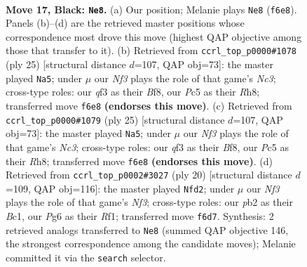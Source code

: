 \documentclass[11pt]{article}
\begin{document}
\clearpage

\begin{figure}[p]\centering
\begin{subfigure}{0.46\textwidth}\centering
\resizebox{\linewidth}{!}{%
\newchessgame
\chessboard[
  setfen={2bq1r2/r3bpkp/p2p1np1/n1pBp3/Pp2P3/3P1Q1N/1PPB1PPP/RN2R1K1 b - - 3 17},
  showmover=false,
  pgfstyle=straightmove, color=movearrow, markmove={f6-e8}
]}
\caption{}
\end{subfigure}\hfill
\begin{subfigure}{0.46\textwidth}\centering
\resizebox{\linewidth}{!}{%
\newchessgame
\chessboard[
  setfen={r3kbnr/1b1q1ppp/ppn1p3/3pP3/P1pP2Q1/N1P2N2/1PB2PPP/R1B2RK1 b kq - 1 13},
  showmover=false,
  pgfstyle=straightmove, color=movearrow, markmove={c6-a5}
]}
\caption{}
\end{subfigure}
\\[4pt]
\begin{subfigure}{0.46\textwidth}\centering
\resizebox{\linewidth}{!}{%
\newchessgame
\chessboard[
  setfen={r3kbnr/1b1q1ppp/ppn1p3/3pP3/P1pP2Q1/N1P2N2/1PB2PPP/R1B2RK1 b kq - 1 13},
  showmover=false,
  pgfstyle=straightmove, color=movearrow, markmove={c6-a5}
]}
\caption{}
\end{subfigure}\hfill
\begin{subfigure}{0.46\textwidth}\centering
\resizebox{\linewidth}{!}{%
\newchessgame
\chessboard[
  setfen={r3k2r/ppp1npp1/1bnpbq1p/4p3/P1N1P3/1BPP1N2/1P3PPP/R1BQ1RK1 w kq - 3 11},
  showmover=false,
  pgfstyle=straightmove, color=movearrow, markmove={f3-d2}
]}
\caption{}
\end{subfigure}
\caption{\textbf{Move 17, Black: \texttt{Ne8}.} (a) Our position; Melanie plays \texttt{Ne8} (\texttt{f6e8}). Panels (b)--(d) are the retrieved master positions whose correspondence most drove this move (highest QAP objective among those that transfer to it). (b) Retrieved from \texttt{ccrl\_top\_p0000\#1078} (ply 25) [structural distance $d$=107, QAP obj=73]: the master played \texttt{Na5}; under $\mu$ our \emph{Nf3} plays the role of that game's \emph{Nc3}; cross-type roles: our \emph{q}f3 as their \emph{B}f8, our \emph{P}c5 as their \emph{R}h8; transferred move \texttt{f6e8} \textbf{(endorses this move)}. (c) Retrieved from \texttt{ccrl\_top\_p0000\#1079} (ply 25) [structural distance $d$=107, QAP obj=73]: the master played \texttt{Na5}; under $\mu$ our \emph{Nf3} plays the role of that game's \emph{Nc3}; cross-type roles: our \emph{q}f3 as their \emph{B}f8, our \emph{P}c5 as their \emph{R}h8; transferred move \texttt{f6e8} \textbf{(endorses this move)}. (d) Retrieved from \texttt{ccrl\_top\_p0002\#3027} (ply 20) [structural distance $d$=109, QAP obj=116]: the master played \texttt{Nfd2}; under $\mu$ our \emph{Nf3} plays the role of that game's \emph{Nf3}; cross-type roles: our \emph{p}b2 as their \emph{B}c1, our \emph{P}g6 as their \emph{R}f1; transferred move \texttt{f6d7}. Synthesis: 2 retrieved analogs transferred to \texttt{Ne8} (summed QAP objective 146, the strongest correspondence among the candidate moves); Melanie committed it via the \texttt{search} selector.}
\label{fig:thought-m33}
\end{figure}
\end{document}
